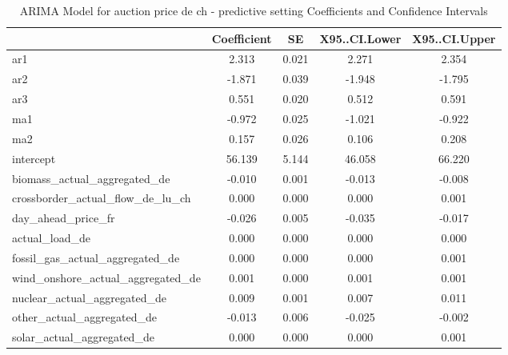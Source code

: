 \begin{table}
\caption{ARIMA Model for auction price de ch - predictive setting Coefficients and Confidence Intervals}
\centering
\begin{tabular}[t]{l|c|c|c|c}
\hline
  & Coefficient & SE & X95..CI.Lower & X95..CI.Upper\\
\hline
ar1 & 2.313 & 0.021 & 2.271 & 2.354\\
\hline
ar2 & -1.871 & 0.039 & -1.948 & -1.795\\
\hline
ar3 & 0.551 & 0.020 & 0.512 & 0.591\\
\hline
ma1 & -0.972 & 0.025 & -1.021 & -0.922\\
\hline
ma2 & 0.157 & 0.026 & 0.106 & 0.208\\
\hline
intercept & 56.139 & 5.144 & 46.058 & 66.220\\
\hline
biomass\_actual\_aggregated\_de & -0.010 & 0.001 & -0.013 & -0.008\\
\hline
crossborder\_actual\_flow\_de\_lu\_ch & 0.000 & 0.000 & 0.000 & 0.001\\
\hline
day\_ahead\_price\_fr & -0.026 & 0.005 & -0.035 & -0.017\\
\hline
actual\_load\_de & 0.000 & 0.000 & 0.000 & 0.000\\
\hline
fossil\_gas\_actual\_aggregated\_de & 0.000 & 0.000 & 0.000 & 0.001\\
\hline
wind\_onshore\_actual\_aggregated\_de & 0.001 & 0.000 & 0.001 & 0.001\\
\hline
nuclear\_actual\_aggregated\_de & 0.009 & 0.001 & 0.007 & 0.011\\
\hline
other\_actual\_aggregated\_de & -0.013 & 0.006 & -0.025 & -0.002\\
\hline
solar\_actual\_aggregated\_de & 0.000 & 0.000 & 0.000 & 0.001\\
\hline
\end{tabular}
\end{table}\begin{table}


\end{table}
